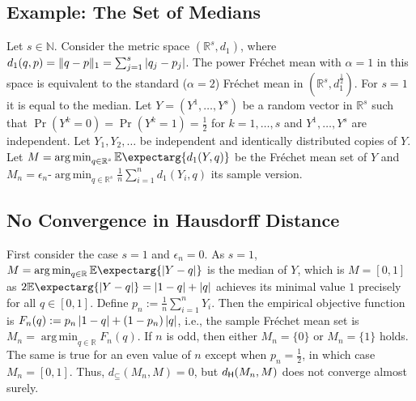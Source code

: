 \documentclass{scrartcl}
\renewcommand{\subset}{\subseteq}
\newcommand{\Ex}{\E\expectarg}
\newcommand{\N}{\mathbb{N}}
\newcommand{\R}{\mathbb{R}}
\newcommand{\normof}[1]{\Vert #1 \Vert}
\DeclareMathOperator*{\argmin}{arg\,min}
\theoremstyle{plain}\newtheorem{theorem}{Theorem}[section]
\theoremstyle{definition}
\theoremstyle{remark}
\begin{document}
 \begin{appendix}
\section{Example: The Set of Medians}\label{sec:median}
Let $s\in\N$. Consider the metric space $(\R^s, d_1)$, where $d_1(q,p) = \normof{q-p}_1 = \sum_{j=1}^s \abs{q_j-p_j}$. The power Fréchet mean with $\alpha=1$ in this space is equivalent to the standard ($\alpha=2$) Fréchet mean in $(\R^s, d_1^{\frac12})$. For $s=1$ it is equal to the median.
Let $Y = (Y^1,\dots, Y^s)$ be a random vector in $\R^s$ such that $\Pr(Y^k=0)=\Pr(Y^k=1)=\frac12$ for $k=1,\dots, s$ and $Y^1,\dots, Y^s$ are independent. Let $Y_1, Y_2,\dots$ be independent and identically distributed copies of $Y$. Let $M = \argmin_{q\in\R^s}\Ex{d_1(Y, q)}$ be the Fréchet mean set of $Y$ and $M_n = \epsilon_n\text{-}\argmin_{q\in\R^s}\frac1n\sum_{i=1}^n d_1(Y_i, q)$ its sample version.

\subsection{No Convergence in Hausdorff Distance}
First consider the case $s=1$ and $\epsilon_n=0$.
As $s=1$,  $M = \argmin_{q\in\R} \Ex{\abs{Y-q}}$ is the median of $Y$, which is $M = [0,1]$ as $2\Ex{\abs{Y-q}} = \abs{1-q}+\abs{q}$ achieves its minimal value $1$ precisely for all $q\in[0,1]$.
Define $p_n := \frac1n \sum_{i=1}^n Y_i$. Then the empirical objective function is $F_n(q) := p_n\left| 1-q \right|+(1-p_n)\left| q \right|$, i.e., the sample Fréchet mean set is $M_n = \argmin_{q\in\R} F_n(q)$.
If $n$ is odd, then either $M_n = \{0\}$ or $M_n = \{1\}$ holds. The same is true for an even value of $n$ except when $p_n=\frac12$, in which case $M_n=[0,1]$.
Thus, $d_{\subset}(M_n, M) = 0$, but $d_{\mathsf{H}}(M_n, M)$ does not converge almost surely.


\end{appendix}
\end{document}
